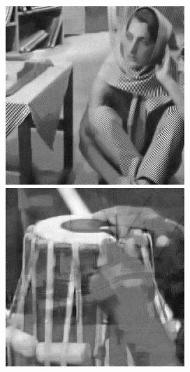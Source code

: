 \begin{figure}[!htbp]
{\begin{minipage}[b]{0.17\linewidth}
\includegraphics[width=1\linewidth]{images/ammca_out3.png}\vspace{4pt}
\includegraphics[width=1\linewidth]{images/ammca_out1.png}
\end{minipage}}

\end{figure}
